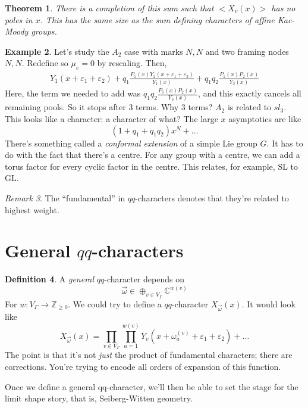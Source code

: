 \documentclass[leqno, openany]{memoir}
\newtheorem{thm}{Theorem}[section]
\theoremstyle{definition}
\newtheorem{defn}[thm]{Definition}
\newtheorem{exm}[thm]{Example}
\theoremstyle{remark}
\newtheorem{rmk}[thm]{Remark}
\theoremstyle{plain}
\theoremstyle{definition}
\theoremstyle{remark}
\newcommand{\ep}{\varepsilon}
\newcommand{\mr}[1]{\mathrm{#1}}
\newcommand{\GL}{\mr{GL}}
\begin{document}
\begin{thm}
There is a completion of this sum such that $<X_v(x)>$ has no poles in $x$. 
This has the same size as the sum defining characters of affine Kac-Moody groups. 
\end{thm}
\begin{exm}
Let's study the $A_2$ case with marks $N,N$ and two framing nodes $N,N$.
Redefine so $\mu_e = 0$ by rescaling. Then, 
\begin{align*}
Y_1(x + \ep_1 + \ep_2) + q_1 \frac{P_1(x) Y_2(x + \ep_1 + \ep_2)}{Y_1(x)} + q_1 q_2 \frac{P_1(x) P_2(x)}{Y_2(x)}
\end{align*}
Here, the term we needed to add was $q_1 q_2 \frac{P_1(x) P_2(x)}{Y_2(x)}$, and this 
exactly cancels all remaining pools. So it stops after 3 terms. Why 3 terms? $A_2$ is related to $sl_3$.
This looks like a character: a character of what?
The large $x$ asymptotics are like 
\[
(1 + q_1 + q_1 q_2) x^N + \dots 
\]
There's something called a \emph{conformal extension} of a simple Lie group $G$. It has to do with the fact that 
there's a centre. For any group with a centre, we can add a torus factor for every cyclic factor in the centre. 
This relates, for example, $\mr{SL}$ to $\GL$. 
\end{exm}

\begin{rmk}
The ``fundamental'' in $qq$-characters denotes that they're related to highest weight. 
\end{rmk}

\section{General $qq$-characters}%
\label{sec:General qq-characters}

\begin{defn}
A \emph{general} $qq$-character depends on 
\[
\vec{\omega} \in \oplus_{v \in V_\Gamma} \mathbb{C}^{w(v)}
\]
For $w : V_\Gamma \to \mathbb{Z}_{\geq 0}$.
We could try to define a $qq$-character $X_{\vec{\omega}}(x)$. It would look like 
\[
X_{\vec{\omega}}(x) = \prod_{v \in V_\Gamma} \prod_{a = 1}^{w(v)} Y_v(x + \omega^{(v)}_a + \ep_1 + \ep_2) + \dots 
\]
The point is that it's not \emph{just} the product of fundamental characters; there are corrections.
You're trying to encode all orders of expansion of this function.
\end{defn}

Once we define a general qq-character, we'll then be able to set the stage for the limit shape story, that is, Seiberg-Witten geometry.
\end{document}
